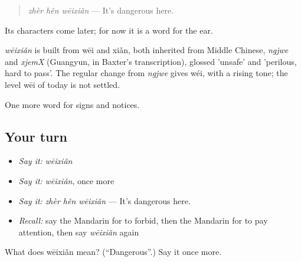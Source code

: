 \begin{quote}
\emph{zhèr hěn wēixiǎn} — It's dangerous here.
\end{quote}

Its characters come later; for now it is a word for the ear.

\begin{cousinweb}
\emph{wēixiǎn} is built from wēi and xiǎn, both inherited from Middle Chinese, \emph{ngjwe} and \emph{xjemX} (Guangyun, in Baxter's transcription), glossed 'unsafe' and 'perilous, hard to pass'. The regular change from \emph{ngjwe} gives wéi, with a rising tone; the level wēi of today is not settled.
\end{cousinweb}

\begin{grammarlens}[title={What you've built}]
One more word for signs and notices.
\end{grammarlens}

\subsection*{Your turn}
\begin{itemize}
\raggedright
  \item \emph{Say it:} \emph{wēixiǎn}
  \item \emph{Say it:} \emph{wēixiǎn}, once more
  \item \emph{Say it:} \emph{zhèr hěn wēixiǎn} — It's dangerous here.
  \item \emph{Recall:} say the Mandarin for to forbid, then the Mandarin for to pay attention, then say \emph{wēixiǎn} again
\end{itemize}

\begin{tcolorbox}[breakable,colback=teal!4,colframe=teal!35!black,title={Before you move on}]
What does wēixiǎn mean? (\textquotedblleft{}Dangerous\textquotedblright{}.) Say it once more.
\end{tcolorbox}
